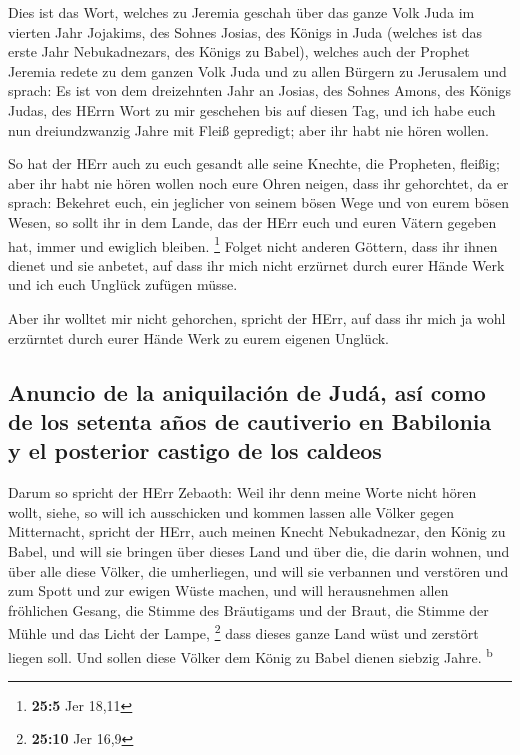  Dies ist das Wort, welches zu Jeremia geschah über das
ganze Volk Juda im vierten Jahr Jojakims, des Sohnes Josias, des Königs
in Juda (welches ist das erste Jahr Nebukadnezars, des Königs zu Babel),
 welches auch der Prophet Jeremia redete zu dem ganzen
Volk Juda und zu allen Bürgern zu Jerusalem und sprach: 
Es ist von dem dreizehnten Jahr an Josias, des Sohnes Amons, des Königs
Judas, des HErrn Wort zu mir geschehen bis auf diesen Tag, und ich habe
euch nun dreiundzwanzig Jahre mit Fleiß gepredigt; aber ihr habt nie
hören wollen.

 So hat der HErr auch zu euch gesandt alle seine Knechte,
die Propheten, fleißig; aber ihr habt nie hören wollen noch eure Ohren
neigen, dass ihr gehorchtet,  da er sprach: Bekehret euch,
ein jeglicher von seinem bösen Wege und von eurem bösen Wesen, so sollt
ihr in dem Lande, das der HErr euch und euren Vätern gegeben hat, immer
und ewiglich bleiben. \footnote{\textbf{25:5} Jer 18,11} 
Folget nicht anderen Göttern, dass ihr ihnen dienet und sie anbetet, auf
dass ihr mich nicht erzürnet durch eurer Hände Werk und ich euch Unglück
zufügen müsse.

 Aber ihr wolltet mir nicht gehorchen, spricht der HErr,
auf dass ihr mich ja wohl erzürntet durch eurer Hände Werk zu eurem
eigenen Unglück.

\hypertarget{anuncio-de-la-aniquilaciuxf3n-de-juduxe1-asuxed-como-de-los-setenta-auxf1os-de-cautiverio-en-babilonia-y-el-posterior-castigo-de-los-caldeos}{%
\subsection{Anuncio de la aniquilación de Judá, así como de los setenta
años de cautiverio en Babilonia y el posterior castigo de los
caldeos}\label{anuncio-de-la-aniquilaciuxf3n-de-juduxe1-asuxed-como-de-los-setenta-auxf1os-de-cautiverio-en-babilonia-y-el-posterior-castigo-de-los-caldeos}}

 Darum so spricht der HErr Zebaoth: Weil ihr denn meine
Worte nicht hören wollt,  siehe, so will ich ausschicken
und kommen lassen alle Völker gegen Mitternacht, spricht der HErr, auch
meinen Knecht Nebukadnezar, den König zu Babel, und will sie bringen
über dieses Land und über die, die darin wohnen, und über alle diese
Völker, die umherliegen, und will sie verbannen und verstören und zum
Spott und zur ewigen Wüste machen,  und will herausnehmen
allen fröhlichen Gesang, die Stimme des Bräutigams und der Braut, die
Stimme der Mühle und das Licht der Lampe, \footnote{\textbf{25:10} Jer
  16,9}  dass dieses ganze Land wüst und zerstört liegen
soll. Und sollen diese Völker dem König zu Babel dienen siebzig Jahre.
\textsuperscript{b}


